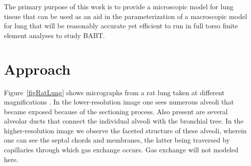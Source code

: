 The primary purpose of this work is to provide a micro\-scopic model for lung tissue that can be used as an aid in the parameterization of a macro\-scopic model for lung that will be reasonably accurate yet efficient to run in full torso finite element analyses to study BABT.

\section{Approach}

Figure~\ref{figRatLung} shows micrographs from a rat lung taken at different magnifications \cite{Freedetal12}. In the lower-resolution image one sees numerous alveoli that became exposed because of the sectioning process.  Also present are several alveolar ducts that connect the individual alveoli with the bronchial tree.  In the higher-resolution image we observe the faceted structure of these alveoli, wherein one can see the septal chords and membranes, the latter being traversed by capillaries through which gas exchange occurs.  Gas exchange will not modeled here.

